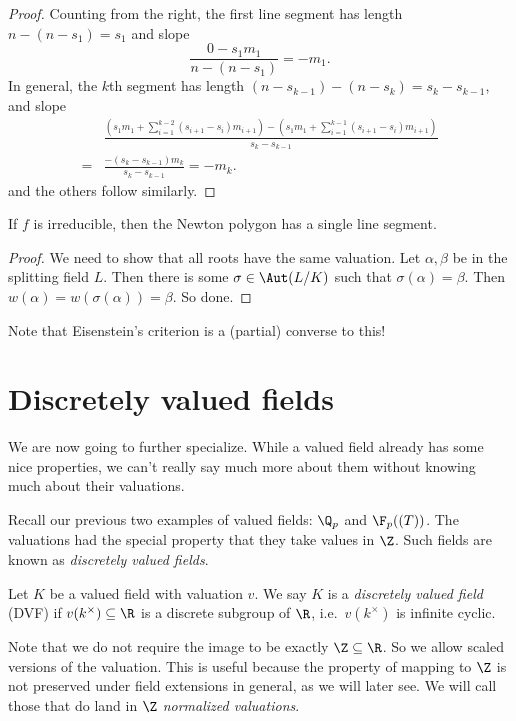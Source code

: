 \documentclass[a4paper]{article}
\begin{document}
\begin{proof}
  Counting from the right, the first line segment has length $n - (n - s_1) = s_1$ and slope
  \[
    \frac{0 - s_1 m_1}{n - (n - s_1)} = -m_1.
  \]
  In general, the $k$th segment has length $(n - s_{k - 1}) - (n - s_k) = s_k - s_{k - 1}$, and slope
  \begin{align*}
    &\frac{\left(s_1 m_1 + \sum_{i = 1}^{k - 2} (s_{i + 1} - s_i) m_{i + 1}\right) - \left(s_1 m_1 + \sum_{i = 1}^{k - 1} (s_{i + 1} - s_i) m_{i + 1}\right)}{s_k - s_{k - 1}} \\
    ={}& \frac{-(s_k - s_{k - 1})m_k}{s_k - s_{k - 1}} = - m_k.
  \end{align*}
  and the others follow similarly.
\end{proof}

\begin{cor}
  If $f$ is irreducible, then the Newton polygon has a single line segment.
\end{cor}

\begin{proof}
  We need to show that all roots have the same valuation. Let $\alpha, \beta$ be in the splitting field $L$. Then there is some $\sigma \in \Aut(L/K)$ such that $\sigma(\alpha) = \beta$. Then $w(\alpha) = w(\sigma(\alpha)) = \beta$. So done.
\end{proof}

Note that Eisenstein's criterion is a (partial) converse to this!

\section{Discretely valued fields}
We are now going to further specialize. While a valued field already has some nice properties, we can't really say much more about them without knowing much about their valuations.

Recall our previous two examples of valued fields: $\Q_p$ and $\F_p((T))$. The valuations had the special property that they take values in $\Z$. Such fields are known as \emph{discretely valued fields}.

\begin{defi}
  Let $K$ be a valued field with valuation $v$. We say $K$ is a \emph{discretely valued field} (DVF) if $v(k^\times) \subseteq \R$ is a discrete subgroup of $\R$, i.e.\ $v(k^\times)$ is infinite cyclic.
\end{defi}
Note that we do not require the image to be exactly $\Z \subseteq \R$. So we allow scaled versions of the valuation. This is useful because the property of mapping to $\Z$ is not preserved under field extensions in general, as we will later see. We will call those that do land in $\Z$ \emph{normalized valuations}.
\end{document}
